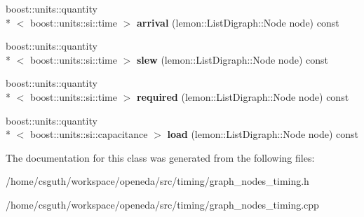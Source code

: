 \begin{DoxyCompactItemize}
\item 
\hypertarget{classophidian_1_1timing_1_1graph__nodes__timing_a6c2ad0796b00f92fdf256c45251b6e26}{boost\-::units\-::quantity\\*
$<$ boost\-::units\-::si\-::time $>$ {\bfseries arrival} (lemon\-::\-List\-Digraph\-::\-Node node) const }\label{classophidian_1_1timing_1_1graph__nodes__timing_a6c2ad0796b00f92fdf256c45251b6e26}

\item 
\hypertarget{classophidian_1_1timing_1_1graph__nodes__timing_a37d8d4224f3119e2afe84d6680742d38}{boost\-::units\-::quantity\\*
$<$ boost\-::units\-::si\-::time $>$ {\bfseries slew} (lemon\-::\-List\-Digraph\-::\-Node node) const }\label{classophidian_1_1timing_1_1graph__nodes__timing_a37d8d4224f3119e2afe84d6680742d38}

\item 
\hypertarget{classophidian_1_1timing_1_1graph__nodes__timing_a63a5387edc2e08efbc86291cb8815b3d}{boost\-::units\-::quantity\\*
$<$ boost\-::units\-::si\-::time $>$ {\bfseries required} (lemon\-::\-List\-Digraph\-::\-Node node) const }\label{classophidian_1_1timing_1_1graph__nodes__timing_a63a5387edc2e08efbc86291cb8815b3d}

\item 
\hypertarget{classophidian_1_1timing_1_1graph__nodes__timing_a080e303f4de1e71effda4c9ae2fa4094}{boost\-::units\-::quantity\\*
$<$ boost\-::units\-::si\-::capacitance $>$ {\bfseries load} (lemon\-::\-List\-Digraph\-::\-Node node) const }\label{classophidian_1_1timing_1_1graph__nodes__timing_a080e303f4de1e71effda4c9ae2fa4094}

\end{DoxyCompactItemize}


The documentation for this class was generated from the following files\-:\begin{DoxyCompactItemize}
\item 
/home/csguth/workspace/openeda/src/timing/graph\-\_\-nodes\-\_\-timing.\-h\item 
/home/csguth/workspace/openeda/src/timing/graph\-\_\-nodes\-\_\-timing.\-cpp\end{DoxyCompactItemize}
